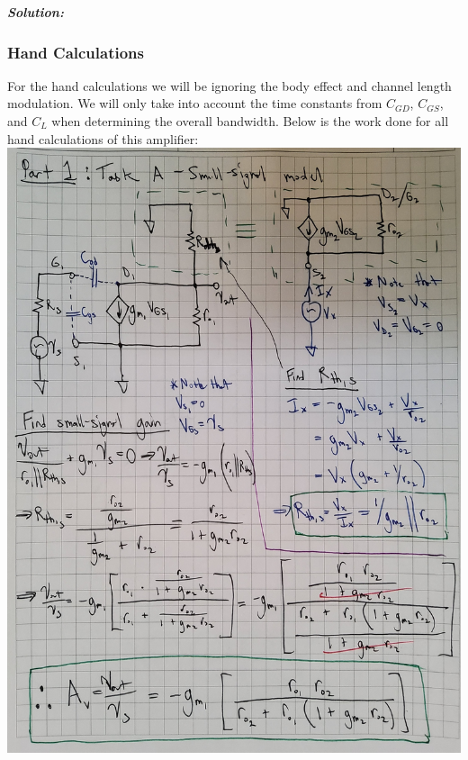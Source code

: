 \documentclass[12pt, fleqn]{article}
\begin{document}
\newpage\noindent
\textbf{\emph{Solution: }}

\subsubsection{Hand Calculations}

For the hand calculations we will be ignoring the body effect and channel length modulation.  We will only take into account the time constants from $C_{GD}$, $C_{GS}$, and $C_L$ when determining the overall bandwidth.  Below is the work done for all hand calculations of this amplifier:\\[1cm]
\includegraphics[scale=0.125, angle=90, center]{p1_1.jpg}\\
\end{document}
